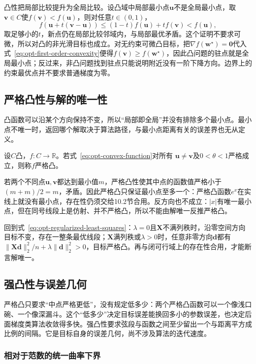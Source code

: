 凸性把局部比较提升为全局比较。设凸域中局部最小点$\bm u$不是全局最小点，取$\bm v\in C$使$f(\bm v)<f(\bm u)$，则对任意$t\in(0,1)$，
\[
  f(\bm u+t(\bm v-\bm u))
  \leq(1-t)f(\bm u)+tf(\bm v)<f(\bm u),
\]
取足够小的$t$，新点仍在局部比较邻域内，与局部最优矛盾。这个证明不要求可微，所以对凸的非光滑目标也成立。对无约束可微凸目标，把$\nabla f(\bm w^\star)=\bm0$代入式~\eqref{eq:opt-first-order-convexity}便得$f(\bm v)\geq f(\bm w^\star)$，因此凸问题的驻点就是全局最小点；反过来，非凸问题找到驻点只能说明附近没有一阶下降方向。边界上的约束最优点并不要求普通梯度为零。

\subsection{严格凸性与解的唯一性}

凸函数可以沿某个方向保持不变，所以“局部即全局”并没有排除多个最小点。最小点不唯一时，返回哪个解取决于算法路径，与最小点距离有关的误差界也无从定义。

\begin{definition}[严格凸函数]
\label{def:opt-strict-convexity}
设$C$凸，$f:C\to\mathbb R$。若式~\eqref{eq:opt-convex-function}对所有
$\bm u\neq\bm v$及$0<\theta<1$严格成立，则称$f$严格凸。
\end{definition}

若两个不同点$\bm u,\bm v$都达到最小值$m$，严格凸性使其中点的函数值严格小于$(m+m)/2=m$，矛盾。因此严格凸只保证最小点至多一个：严格凸函数$e^x$在实线上就没有最小点，存在性仍须交给10.2节合用。反方向也不成立：$|x|$有唯一最小点，但在同号线段上是仿射、并不严格凸，所以不能由解唯一反推严格凸。

回到式~\eqref{eq:opt-regularized-least-squares}：$\lambda=0$且$\bm X$不满列秩时，沿零空间方向目标不变，存在一整条最优线段；$\bm X$满列秩或$\lambda>0$时，任意非零方向$\bm d$都有$\|\bm X\bm d\|_2^2/n+\lambda\|\bm d\|_2^2>0$，目标严格凸。再与闭可行域上的存在性合用，才能断言解唯一。

\subsection{强凸性与误差几何}
\label{sec:opt-strong-convex}

严格凸只要求“中点严格更低”，没有规定低多少：两个严格凸函数可以一个像浅口碗、一个像深漏斗。这个“低多少”决定目标误差能换回多小的参数误差，也决定后面梯度类算法收敛得多快。强凸性要求弦段与函数之间至少留出一个与距离平方成比例的间隔。它是目标自身的误差几何，尚不涉及算法的迭代速度。

\subsubsection{相对于范数的统一曲率下界}

